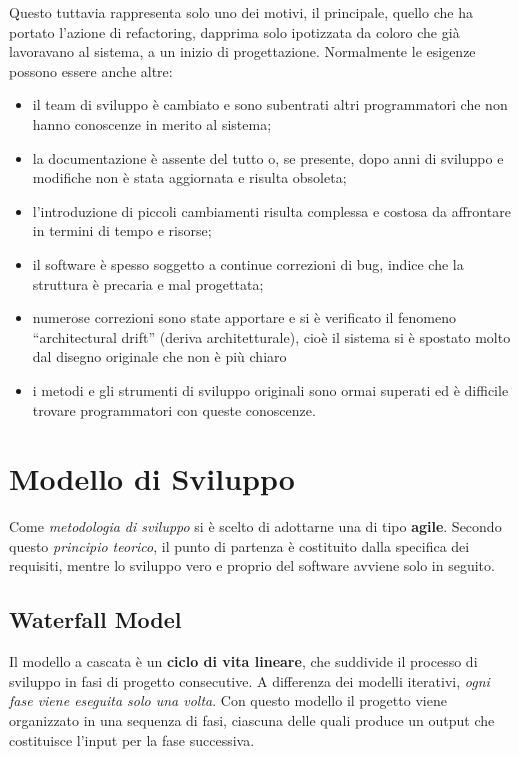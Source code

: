 Questo tuttavia rappresenta solo uno dei motivi, il principale, quello che ha portato l'azione di refactoring, dapprima solo ipotizzata da coloro che già lavoravano al sistema, a un inizio di progettazione. Normalmente le esigenze possono essere anche altre:

\begin{itemize}
    \item il team di sviluppo è cambiato e sono subentrati altri programmatori che non hanno conoscenze in merito al sistema;
    \item la documentazione è assente del tutto o, se presente, dopo anni di sviluppo e modifiche non è stata aggiornata e risulta obsoleta;
    \item  l'introduzione di piccoli cambiamenti risulta complessa e costosa da affrontare in termini di tempo e risorse;
    \item il software è spesso soggetto a continue correzioni di bug, indice che la struttura è precaria e mal progettata;
    \item numerose correzioni sono state apportare e si è verificato il fenomeno ``architectural drift'' (deriva architetturale), cioè il sistema si è spostato molto dal disegno originale che non è più chiaro
    \item i metodi e gli strumenti di sviluppo originali sono ormai superati ed è difficile trovare programmatori con queste conoscenze.
\end{itemize}

\section{Modello di Sviluppo}
Come \textit{metodologia di sviluppo} si è scelto di adottarne una di tipo \textbf{agile}. Secondo questo \emph{principio teorico}, il punto di partenza è costituito dalla specifica dei requisiti, mentre lo sviluppo vero e proprio del software avviene solo in seguito.

\subsection{Waterfall Model}
Il modello a cascata è un \textbf{ciclo di vita lineare}, che suddivide il processo di sviluppo in fasi di progetto consecutive. A differenza dei modelli iterativi, \textit{ogni fase viene eseguita solo una volta}. Con questo modello il progetto viene organizzato in una sequenza di fasi, ciascuna delle quali produce un output che costituisce l’input per la fase successiva.

